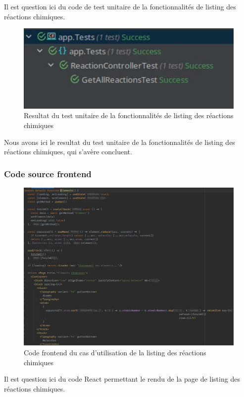 Il est question ici du code de test unitaire de la fonctionnalités de listing des réactions chimiques.

\begin{figure}[H]
	\centering
	\includegraphics[width=1\textwidth]{img/utrcr}
	\caption{Resultat du test unitaire de la fonctionnalités de listing des réactions chimiques}
\end{figure}

Nous avons ici le resultat du test unitaire de la fonctionnalités de listing des réactions chimiques, qui s'avère concluent.

\subsubsection{Code source frontend}

\begin{figure}[H]
	\centering
	\includegraphics[width=1\textwidth]{img/frl}
	\caption{Code frontend du cas d'utilisation de la listing des réactions chimiques}
\end{figure}

Il est question ici du code React permettant le rendu de la page de listing des réactions chimiques.